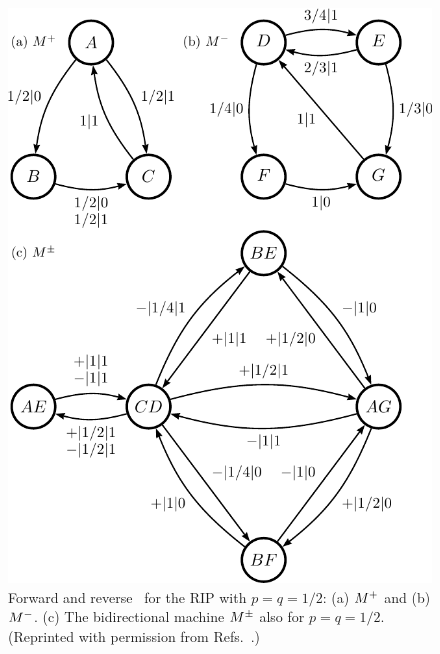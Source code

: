 \begin{figure}[th]
\centering
\includegraphics[scale=\figscale]{../chapter2/figures/RIP}
\caption{
  Forward and reverse \eMs\ for the RIP with $p=q=1/2$: (a) ${M}^{+}$ and
  (b) ${M}^{-}$. (c) The bidirectional machine ${M}^{\pm}$ also for $p = q = 1/2$.
  (Reprinted with permission from Refs.~\cite{Crut08a}.)
  }
\label{fig:RIP}
\end{figure}

